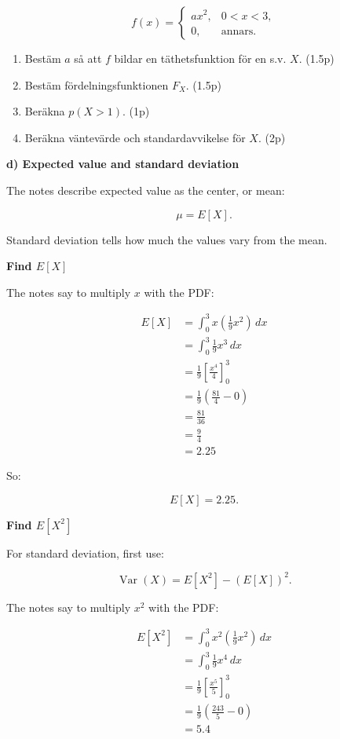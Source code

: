 \documentclass[10pt]{article}
\begin{document}
\[
f(x)=
\begin{cases}
ax^2,
& 0<x<3,\\
0,
& \text{annars.}
\end{cases}
\]

\begin{enumerate}[label=\alph*)]
\item
Bestäm $a$ så att $f$ bildar en täthetsfunktion för en s.v. $X$.
\hfill (1.5p)

\item
Bestäm fördelningsfunktionen $F_X$.
\hfill (1.5p)

\item
Beräkna $p(X>1)$.
\hfill (1p)

\item
Beräkna väntevärde och standardavvikelse för $X$.
\hfill (2p)
\end{enumerate}

\textbf{d) Expected value and standard deviation}

The notes describe expected value as the center, or mean:

\[
\mu=E[X].
\]

Standard deviation tells how much the values vary from the mean.

\textbf{Find $E[X]$}

The notes say to multiply $x$ with the PDF:

\begin{align*}
E[X]
&=
\int_0^3
x\left(\frac{1}{9}x^2\right)\,dx \\[2mm]
&=
\int_0^3
\frac{1}{9}x^3\,dx \\[2mm]
&=
\frac{1}{9}
\left[
\frac{x^4}{4}
\right]_0^3 \\[2mm]
&=
\frac{1}{9}
\left(
\frac{81}{4}-0
\right) \\[2mm]
&=
\frac{81}{36} \\[2mm]
&=
\frac{9}{4} \\[2mm]
&=2.25
\end{align*}

So:

\[
E[X]=2.25.
\]

\textbf{Find $E[X^2]$}

For standard deviation, first use:

\[
\operatorname{Var}(X)
=
E[X^2]-(E[X])^2.
\]

The notes say to multiply $x^2$ with the PDF:

\begin{align*}
E[X^2]
&=
\int_0^3
x^2\left(\frac{1}{9}x^2\right)\,dx \\[2mm]
&=
\int_0^3
\frac{1}{9}x^4\,dx \\[2mm]
&=
\frac{1}{9}
\left[
\frac{x^5}{5}
\right]_0^3 \\[2mm]
&=
\frac{1}{9}
\left(
\frac{243}{5}-0
\right) \\[2mm]
&=
5.4
\end{align*}
\end{document}
